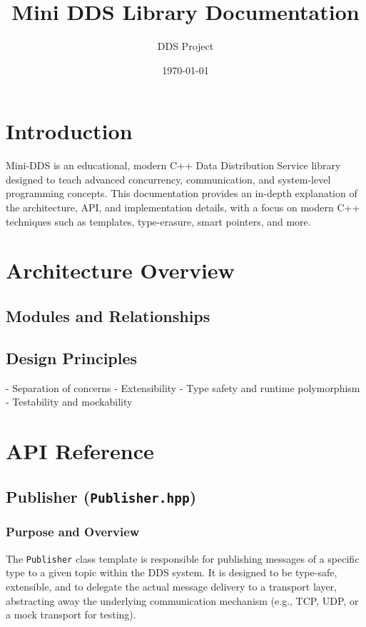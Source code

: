 \documentclass[12pt]{report}
\title{Mini DDS Library Documentation}
\author{DDS Project}
\date{\today}
\begin{document}
\maketitle
\tableofcontents

\chapter{Introduction}
Mini-DDS is an educational, modern C++ Data Distribution Service library designed to teach advanced concurrency, communication, and system-level programming concepts. This documentation provides an in-depth explanation of the architecture, API, and implementation details, with a focus on modern C++ techniques such as templates, type-erasure, smart pointers, and more.

\chapter{Architecture Overview}
\section{Modules and Relationships}

\section{Design Principles}
- Separation of concerns
- Extensibility
- Type safety and runtime polymorphism
- Testability and mockability

\chapter{API Reference}

\section{Publisher (\texttt{Publisher.hpp})}

\subsection{Purpose and Overview}
The \texttt{Publisher} class template is responsible for publishing messages of a specific type to a given topic within the DDS system. It is designed to be type-safe, extensible, and to delegate the actual message delivery to a transport layer, abstracting away the underlying communication mechanism (e.g., TCP, UDP, or a mock transport for testing).
\end{document}
